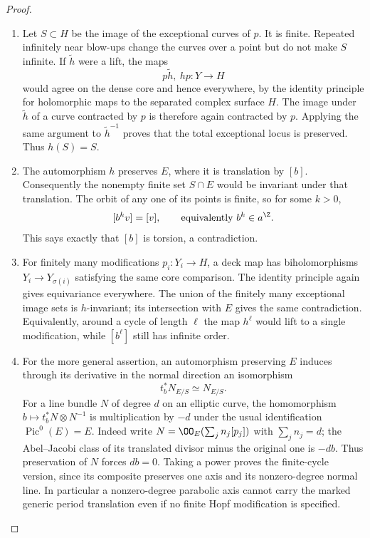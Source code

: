 \begin{proof}
\begin{enumerate}[label=\arabic*.,leftmargin=*]
\item Let $S\subset H$ be the image of the exceptional curves of $p$.
It is finite. Repeated infinitely near blow-ups change the curves
over a point but do not make $S$ infinite.
If $\widetilde h$ were a lift, the maps
\[
 p\widetilde h,\ hp:Y\longrightarrow H
\]
would agree on the dense core and hence everywhere, by the identity
principle for holomorphic maps to the separated complex surface $H$.
The image under $\widetilde h$ of a curve contracted by $p$ is
therefore again contracted by $p$. Applying the same argument to
$\widetilde h^{-1}$ proves that the total exceptional locus is
preserved. Thus $h(S)=S$.

\item The automorphism $h$ preserves $E$, where it is translation by
$[b]$. Consequently the nonempty finite set $S\cap E$ would be
invariant under that translation. The orbit of any one of its
points is finite, so for some $k>0$,
\[
 [b^k v]=[v],\qquad\text{equivalently } b^k\in a^\Z.
\]
This says exactly that $[b]$ is torsion, a contradiction.

\item For finitely many modifications $p_i:Y_i\to H$, a deck map has biholomorphisms
$Y_i\to Y_{\sigma(i)}$ satisfying the same core comparison.
The identity principle again gives equivariance everywhere.
The union of the finitely many exceptional image sets is
$h$-invariant; its intersection with $E$ gives the same contradiction.
Equivalently, around a cycle of length $\ell$ the map $h^\ell$
would lift to a single modification, while $[b^\ell]$ still has
infinite order.

\item For the more general assertion, an automorphism preserving $E$ induces through its derivative in the normal
direction an isomorphism
\[
 t_b^*N_{E/S}\simeq N_{E/S}.
\]
For a line bundle $N$ of degree $d$ on an elliptic curve, the
homomorphism $b\mapsto t_b^*N\otimes N^{-1}$ is multiplication
by $-d$ under the usual identification $\operatorname{Pic}^0(E)=E$.
Indeed write $N=\OO_E(\sum_j n_j[p_j])$ with
$\sum_j n_j=d$; the Abel--Jacobi class of its translated divisor
minus the original one is $-d b$.
Thus preservation of $N$ forces $d b=0$.
Taking a power proves the finite-cycle version, since its composite
preserves one axis and its nonzero-degree normal line.
In particular a nonzero-degree parabolic axis cannot carry the
marked generic period translation even if no finite Hopf
modification is specified.


\end{enumerate}
\end{proof}
